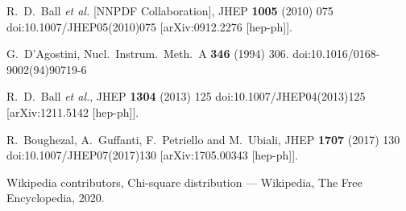 \documentclass[10pt,a4paper]{article}
\begin{document}
\begin{thebibliography}{alp}

  R.~D.~Ball {\it et al.} [NNPDF Collaboration],
  JHEP {\bf 1005} (2010) 075
  doi:10.1007/JHEP05(2010)075
  [arXiv:0912.2276 [hep-ph]].

  G.~D'Agostini,
  Nucl.\ Instrum.\ Meth.\ A {\bf 346} (1994) 306.
  doi:10.1016/0168-9002(94)90719-6

  R.~D.~Ball {\it et al.},
  JHEP {\bf 1304} (2013) 125
  doi:10.1007/JHEP04(2013)125
  [arXiv:1211.5142 [hep-ph]].

  R.~Boughezal, A.~Guffanti, F.~Petriello and M.~Ubiali,
  JHEP {\bf 1707} (2017) 130
  doi:10.1007/JHEP07(2017)130
  [arXiv:1705.00343 [hep-ph]].

    Wikipedia contributors,
    Chi-square distribution --- {Wikipedia}{,} The Free Encyclopedia,
    2020.


\end{thebibliography}
\end{document}
